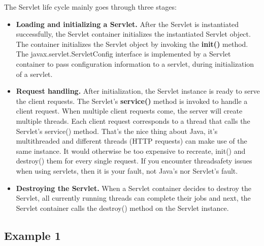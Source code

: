 The Servlet life cycle mainly goes through three stages:\cite{servlet_lifecycle}

\begin{itemize}
\item \textbf{Loading and initializing a Servlet.} After the Servlet is instantiated successfully, the Servlet container initializes the instantiated Servlet object. The container initializes the Servlet object by invoking the \textbf{init()} method. The javax.servlet.ServletConfig interface is implemented by a Servlet container to pass configuration information to a servlet, during initialization of a servlet.
\item \textbf{Request handling.} After initialization, the Servlet instance is ready to serve the client requests.  The Servlet's \textbf{service()} method is invoked to handle a client request. When multiple client requests come, the server will create multiple threads. Each client request corresponds to a thread that calls the Servlet's service() method.  That's the nice thing about Java, it's multithreaded and different threads (HTTP requests) can make use of the same instance. It would otherwise be too expensive to recreate, init() and destroy() them for every single request. If you encounter threadsafety issues when using servlets, then it is your fault, not Java's nor Servlet's fault.
\item \textbf{Destroying the Servlet.} When a Servlet container decides to destroy the Servlet,  all currently running threads can complete their jobs and next, the Servlet container calls the destroy() method on the Servlet instance.
\end{itemize}

\subsection{Example 1}

